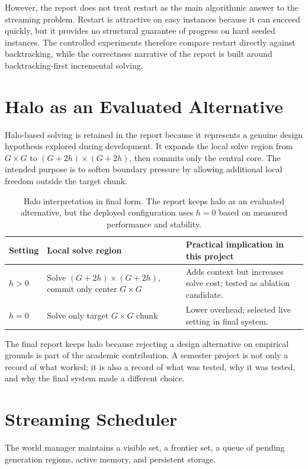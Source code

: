 \documentclass[12pt,a4paper]{report}
\begin{document}
However, the report does not treat restart as the main algorithmic answer to the streaming problem. Restart is attractive on easy instances because it can succeed quickly, but it provides no structural guarantee of progress on hard seeded instances. The controlled experiments therefore compare restart directly against backtracking, while the correctness narrative of the report is built around backtracking-first incremental solving.

\section{Halo as an Evaluated Alternative}
Halo-based solving is retained in the report because it represents a genuine design hypothesis explored during development. It expands the local solve region from $G \times G$ to $(G+2h)\times(G+2h)$, then commits only the central core. The intended purpose is to soften boundary pressure by allowing additional local freedom outside the target chunk.

\begin{table}[H]
\centering
\small
\begin{tabular}{p{2.2cm} p{4.3cm} p{4.3cm}}
\toprule
Setting & Local solve region & Practical implication in this project \\
\midrule
$h>0$ & Solve $(G+2h)\times(G+2h)$, commit only center $G\times G$ & Adds context but increases solve cost; tested as ablation candidate. \\
$h=0$ & Solve only target $G\times G$ chunk & Lower overhead; selected live setting in final system. \\
\bottomrule
\end{tabular}
\caption{Halo interpretation in final form. The report keeps halo as an evaluated alternative, but the deployed configuration uses $h=0$ based on measured performance and stability.}
\label{tab:halo-interpretation}
\end{table}

The final report keeps halo because rejecting a design alternative on empirical grounds is part of the academic contribution. A semester project is not only a record of what worked; it is also a record of what was tested, why it was tested, and why the final system made a different choice.

\section{Streaming Scheduler}
The world manager maintains a visible set, a frontier set, a queue of pending generation regions, active memory, and persistent storage.
\end{document}
